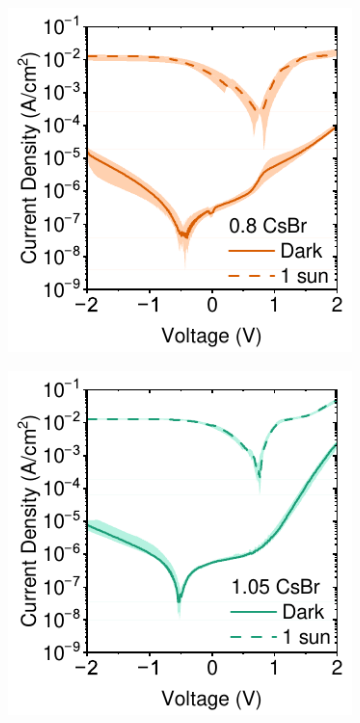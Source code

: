 



\begin{figure}[htbp]
    \centering

    \begin{subfigure}[b]{0.3\textwidth}
        \centering
        \includegraphics[width=\textwidth]{chapters/material_properties/images/08CsBr.pdf}
        \caption{}
    \end{subfigure}
    \hfill
    \begin{subfigure}[b]{0.3\textwidth}
        \centering
        \includegraphics[width=\textwidth]{chapters/material_properties/images/105CsBr.pdf}

\end{subfigure}
\end{figure}
